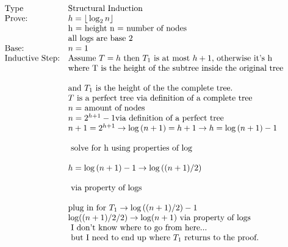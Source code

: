 \documentclass[letterpaper]{article}
\begin{document}
    \section{}
    	\begin{displaymath}
            \begin{array}{llll}
            $Type$ & $Structural Induction$ &&\\
            $Prove:$ & h={\lfloor}\log_2{n}{\rfloor} &&\\
            & $h = height n = number of nodes$ &&\\
            & $all logs are base 2$ &&\\
            $Base:$ & n=1 &&\\
            $Inductive Step:$ & $Assume $ T = h $ then $ T_1 $ is at most $ h+1, $ otherwise it's h$ &&\\
            & $where T is the height of the subtree inside the original tree $&&\\
            \\
            & $and $ T_1 $ is the height of the the complete tree. $&&\\
			& T $ is a perfect tree via definition of a complete tree $ &&\\
            & n = $ amount of nodes$ &&\\
            & n = 2^{h+1} - 1 $via definition of a perfect tree $ &&\\
            & n + 1 = 2^{h+1} \rightarrow\log{(n+1)}=h+1\rightarrow h=\log{(n+1)}-1&&\\
			\\
            & $ solve for h using properties of log $ &&\\
            \\
            & h=\log{(n+1)}-1 \rightarrow \log{((n+1)/2)} &&\\
            \\
            & $ via property of logs $ &&\\
            \\
            & $plug in for $ T_1 \rightarrow \log{((n+1)/2)} - 1 &&\\
            & \log((n+1)/2/2) \rightarrow \log(n+1) $ via property of logs$ &&\\
            &$ I don't know where to go from here... $&&\\
            &$ but I need to end up where $T_1$ returns to the proof.$&&\\
            \end{array}
        \end{displaymath}
\end{document}
